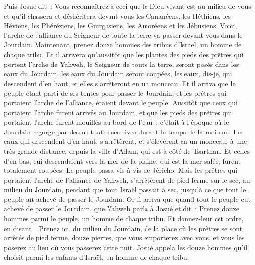 \begin{multicols}{2}
Puis Josué dit~: Vous reconnaîtrez à ceci que le Dieu vivant est au milieu de vous et qu'il chassera et déshéritera devant vous les Cananéens, les Héthiens, les Héviens, les Phéréziens, les Guirgasiens, les Amoréens et les Jébusiens.
Voici, l'arche de l'alliance du Seigneur de toute la terre va passer devant vous dans le Jourdain.
Maintenant, prenez douze hommes des tribus d'Israël, un homme de chaque tribu.
Et il arrivera qu'aussitôt que les plantes des pieds des prêtres qui portent l'arche de Yahweh, le Seigneur de toute la terre, seront posés dans les eaux du Jourdain, les eaux du Jourdain seront coupées, les eaux, dis-je, qui descendent d'en haut, et elles s'arrêteront en un monceau.
Et il arriva que le peuple étant parti de ses tentes pour passer le Jourdain, et les prêtres qui portaient l'arche de l'alliance, étaient devant le peuple.
Aussitôt que ceux qui portaient l'arche furent arrivés au Jourdain, et que les pieds des prêtres qui portaient l'arche furent mouillés au bord de l'eau~; c'était à l'époque où le Jourdain regorge par-dessus toutes ses rives durant le temps de la moisson.
Les eaux qui descendent d'en haut, s'arrêtèrent, et s'élevèrent en un monceau, à une très grande distance, depuis la ville d'Adam, qui est à côté de Tsarthan. Et celles d'en bas, qui descendaient vers la mer de la plaine, qui est la mer salée, furent totalement coupées. Le peuple passa vis-à-vis de Jéricho.
Mais les prêtres qui portaient l'arche de l'alliance de Yahweh, s'arrêtèrent de pied ferme sur le sec, au milieu du Jourdain, pendant que tout Israël passait à sec, jusqu'à ce que tout le peuple ait achevé de passer le Jourdain.
\VerseOne{}Or il arriva que quand tout le peuple eut achevé de passer le Jourdain, que Yahweh parla à Josué et dit~:
Prenez douze hommes parmi le peuple, un homme de chaque tribu.
Et donnez-leur cet ordre, en disant~: Prenez ici, du milieu du Jourdain, de la place où les prêtres se sont arrêtés de pied ferme, douze pierres, que vous emporterez avec vous, et vous les poserez au lieu où vous passerez cette nuit.
Josué appela les douze hommes qu'il choisit parmi les enfants d'Israël, un homme de chaque tribu.

\end{multicols}
